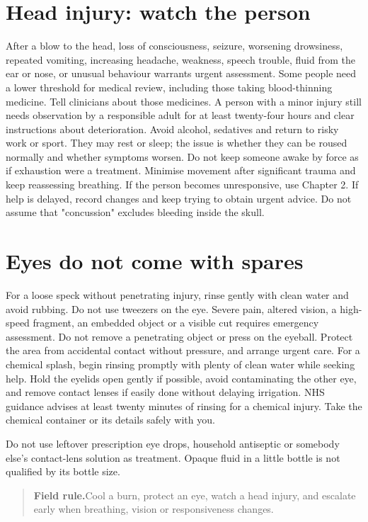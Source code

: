 \documentclass[10pt,openright]{book}
\newcommand{\fieldrule}[1]{\begin{quote}\textbf{Field rule.}\enspace #1\end{quote}}
\begin{document}
\section*{Head injury: watch the person}
After a blow to the head, loss of consciousness, seizure, worsening drowsiness, repeated vomiting, increasing headache, weakness, speech trouble, fluid from the ear or nose, or unusual behaviour warrants urgent assessment. Some people need a lower threshold for medical review, including those taking blood-thinning medicine. Tell clinicians about those medicines. A person with a minor injury still needs observation by a responsible adult for at least twenty-four hours and clear instructions about deterioration. Avoid alcohol, sedatives and return to risky work or sport. They may rest or sleep; the issue is whether they can be roused normally and whether symptoms worsen. Do not keep someone awake by force as if exhaustion were a treatment. Minimise movement after significant trauma and keep reassessing breathing. If the person becomes unresponsive, use Chapter 2. If help is delayed, record changes and keep trying to obtain urgent advice. Do not assume that "concussion" excludes bleeding inside the skull.

\section*{Eyes do not come with spares}
For a loose speck without penetrating injury, rinse gently with clean water and avoid rubbing. Do not use tweezers on the eye. Severe pain, altered vision, a high-speed fragment, an embedded object or a visible cut requires emergency assessment. Do not remove a penetrating object or press on the eyeball. Protect the area from accidental contact without pressure, and arrange urgent care. For a chemical splash, begin rinsing promptly with plenty of clean water while seeking help. Hold the eyelids open gently if possible, avoid contaminating the other eye, and remove contact lenses if easily done without delaying irrigation. NHS guidance advises at least twenty minutes of rinsing for a chemical injury. Take the chemical container or its details safely with you.

Do not use leftover prescription eye drops, household antiseptic or somebody else's contact-lens solution as treatment. Opaque fluid in a little bottle is not qualified by its bottle size.

\fieldrule{Cool a burn, protect an eye, watch a head injury, and escalate early when breathing, vision or responsiveness changes.}
\end{document}

